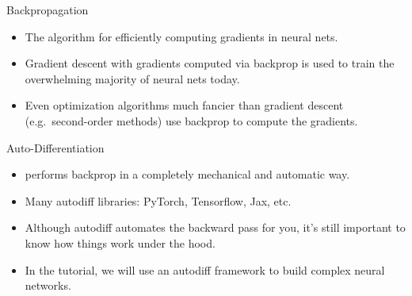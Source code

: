 \documentclass[handout,aspectratio=169]{beamer}
\begin{document}
\begin{frame}{Backpropagation}

  \begin{itemize}
  \item The algorithm for efficiently computing gradients in neural nets.\\[3mm]
  \item Gradient descent with gradients computed via backprop is used to train the overwhelming majority of neural nets today.\\[3mm]

  \item Even optimization algorithms much fancier than gradient descent (e.g.~second-order methods) use backprop to compute the gradients.
  
  \end{itemize}
\end{frame}

\begin{frame}{Auto-Differentiation}
	\begin{itemize}
		\item {} performs backprop in a completely mechanical and automatic way.\\[3mm]
		\item Many autodiff libraries: PyTorch, Tensorflow, Jax, etc.\\[3mm]
		\item Although autodiff automates the backward pass for you, it's still important to know how things work under the hood.\\[3mm]
		\item In the tutorial, we will use an autodiff framework to build complex neural networks.
	\end{itemize}
\end{frame}


  
\end{document}

